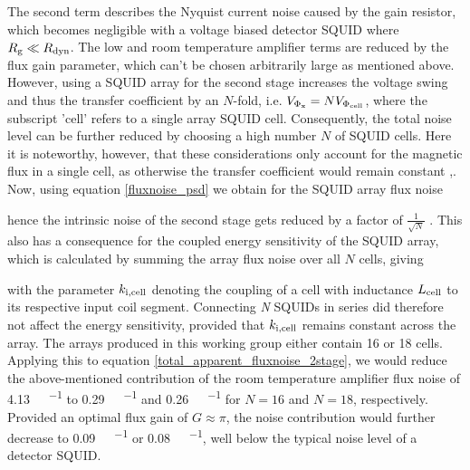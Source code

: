 The second term describes the Nyquist current noise caused by the gain resistor, which becomes negligible with a voltage biased detector SQUID where $R_{\rm g}\ll R_{\rm dyn}$. The low and room temperature amplifier terms are reduced by the flux gain parameter, which can't be chosen arbitrarily large as mentioned above. However, using a SQUID array for the second stage increases the voltage swing and thus the transfer coefficient by an $N$-fold, i.e. $V_{\rm \Phi_x} = NV_{\rm \Phi_{cell}}$, where the subscript 'cell' refers to a single array SQUID cell. Consequently, the total noise level can be further reduced by choosing a high number $N$ of SQUID cells. Here it is noteworthy, however, that these considerations only account for the magnetic flux in a single cell, as otherwise the transfer coefficient would remain constant \cite{Stawiasz1993},\cite{Foglietti1993}.  Now, using equation \ref{fluxnoise_psd} we obtain for the SQUID array flux noise


hence the intrinsic noise of the second stage gets reduced by a factor of $\frac{1}{\sqrt{N}}$ \cite{Stawiasz1993}. This also has a consequence for the coupled energy sensitivity of the SQUID array, which is calculated by summing the array flux noise over all $N$ cells, giving




with the parameter $k_{\rm i,cell}$ denoting the coupling of a cell with inductance $L_{\rm cell}$ to its respective input coil segment. Connecting \textit{N} SQUIDs in series did therefore not affect the energy sensitivity, provided that $k_{\rm i,cell}$ remains constant across the array. The arrays produced in this working group either contain 16 \cite{Kempf2015} or 18 \cite{Kraemer2023} cells. Applying this to equation \ref{total_apparent_fluxnoise_2stage}, we would reduce the above-mentioned contribution of the room temperature amplifier flux noise of \qty{4.13}{\micro\fq\per\sqrthz} to \qty{0.29}{\micro\fq\per\sqrthz} and \qty{0.26}{\micro\fq\per\sqrthz} for $N=16$ and $N=18$, respectively. Provided an optimal flux gain of $G\approx\pi$, the noise contribution would further decrease to \qty{0.09}{\micro\fq\per\sqrthz} or \qty{0.08}{\micro\fq\per\sqrthz}, well below the typical noise level of a detector SQUID. \\

